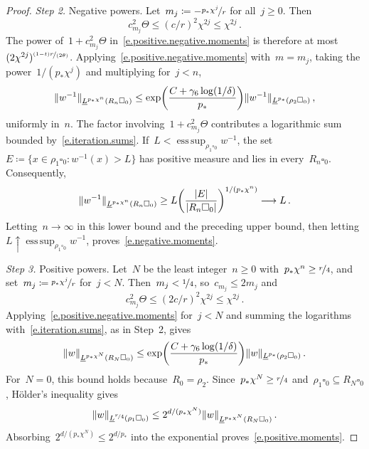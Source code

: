 \documentclass[11pt,letterpaper]{article}
\numberwithin{equation}{section}
\theoremstyle{definition}
\newcommand{\nf}{\nicefrac}
\newcommand{\cu}{\square}
\DeclareMathOperator*{\esssup}{ess\,sup}
\DeclarePairedDelimiter{\norm}{\lVert}{\rVert}
\begin{document}
\begin{proof}
\smallskip

\emph{Step 2.} Negative powers. Let~$m_j\coloneqq-\nf{p_*\chi^j}r$ for all~$j\geq0$. Then
\begin{equation*}
	c_{m_j}^2\Theta\leq(c/r)^2\chi^{2j}\leq\chi^{2j}\,.
\end{equation*}
The power of~$1+c_{m_j}^2\Theta$ in~\eqref{e.positive.negative.moments} is therefore at most~$(2\chi^{2j})^{\nf{(1-t)r}{(2\theta)}}$. Applying~\eqref{e.positive.negative.moments} with~$m=m_j$, taking the power~$1/(p_*\chi^j)$ and multiplying for~$j<n$,
\begin{equation*}
	\norm{w^{-1}}_{\underline L^{p_*\chi^n}(R_n\cu_0)}\leq\exp\biggl(\frac{C+\gamma_6\log(1/\delta)}{p_*}\biggr)\norm{w^{-1}}_{\underline L^{p_*}(\rho_2\cu_0)}\,,
\end{equation*}
uniformly in~$n$. The factor involving~$1+c_{m_j}^2\Theta$ contributes a logarithmic sum bounded by~\eqref{e.iteration.sums}. If~$L<\esssup_{\rho_1\cu_0}w^{-1}$, the set~$E\coloneqq\{x\in\rho_1\cu_0:w^{-1}(x)>L\}$ has positive measure and lies in every~$R_n\cu_0$. Consequently,
\begin{equation*}
	\norm{w^{-1}}_{\underline L^{p_*\chi^n}(R_n\cu_0)}\geq L\biggl(\frac{|E|}{|R_n\cu_0|}\biggr)^{1/(p_*\chi^n)}\longrightarrow L\,.
\end{equation*} Letting~$n\to\infty$ in this lower bound and the preceding upper bound, then letting~$L\uparrow\esssup_{\rho_1\cu_0}w^{-1}$, proves~\eqref{e.negative.moments}.

\smallskip

\emph{Step 3.} Positive powers. Let~$N$ be the least integer~$n\geq0$ with~$p_*\chi^n\geq\nf r4$, and set~$m_j\coloneqq\nf{p_*\chi^j}r$ for~$j<N$. Then~$m_j<\nf14$, so~$c_{m_j}\leq2m_j$ and
\begin{equation*}
	c_{m_j}^2\Theta\leq(2c/r)^2\chi^{2j}\leq\chi^{2j}\,.
\end{equation*}
Applying~\eqref{e.positive.negative.moments} for~$j<N$ and summing the logarithms with~\eqref{e.iteration.sums}, as in Step~2, gives
\begin{equation*}
	\norm{w}_{\underline L^{p_*\chi^N}(R_N\cu_0)}\leq\exp\biggl(\frac{C+\gamma_6\log(1/\delta)}{p_*}\biggr)\norm{w}_{\underline L^{p_*}(\rho_2\cu_0)}\,.
\end{equation*}
For~$N=0$, this bound holds because~$R_0=\rho_2$. Since~$p_*\chi^N\geq\nf r4$ and~$\rho_1\cu_0\subseteq R_N\cu_0$, H\"older's inequality gives
\begin{equation*}
	\norm{w}_{\underline L^{\nf r4}(\rho_1\cu_0)}\leq2^{d/(p_*\chi^N)}\norm{w}_{\underline L^{p_*\chi^N}(R_N\cu_0)}\,.
\end{equation*} Absorbing~$2^{d/(p_*\chi^N)}\leq2^{d/p_*}$ into the exponential proves~\eqref{e.positive.moments}.
\end{proof}
\end{document}

